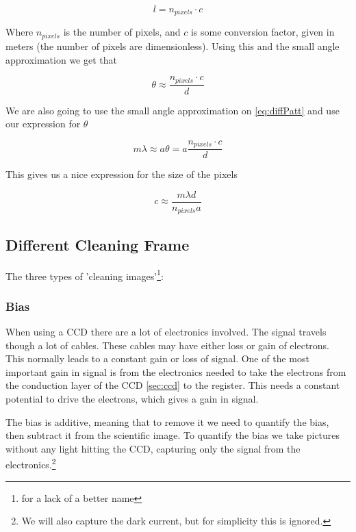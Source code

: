 \documentclass{emulateapj}
\begin{document}
\begin{equation}
l = n_{pixels}\cdot c
\end{equation}

Where $n_{pixels}$ is the number of pixels, and $c$ is some conversion factor, given in meters (the number of pixels are dimensionless). Using this and the small angle approximation we get that

\begin{equation}
\theta \approx \frac{n_{pixels}\cdot c}{d}
\end{equation}

We are also going to use the small angle approximation on \eqref{eq:diffPatt} and use our expression for $\theta$

\begin{equation}
m\lambda \approx a\theta = a\frac{n_{pixels}\cdot c}{d}
\end{equation}

This gives us a nice expression for the size of the pixels

\begin{equation}
c \approx \frac{m\lambda d}{n_{pixels}a}
\label{eq:pixelSize}
\end{equation}


\subsection{Different Cleaning Frame}

The three types of 'cleaning images'\footnote{for a lack of a better name}:

\subsubsection{Bias}
When using a CCD there are a lot of electronics involved. The signal travels though a lot of cables. These cables may have either loss or gain of electrons. This normally leads to a constant gain or loss of signal. One of the most important gain in signal is from the electronics needed to take the electrons from the conduction layer of the CCD \ref{sec:ccd} to the register. This needs a constant potential to drive the electrons, which gives a gain in signal.

The bias is additive, meaning that to remove it we need to quantify  the bias, then subtract it from the scientific image. To quantify the bias we take pictures without any light hitting the CCD, capturing only the signal from the electronics.\footnote{We will also capture the dark current, but for simplicity this is ignored.}
\end{document}
